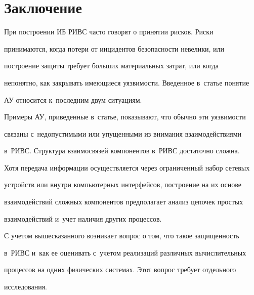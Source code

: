 \vspace*{-4pt}


  


\section{Заключение}





  При построении ИБ РИВС часто говорят о принятии рисков. Риски 


принимаются, когда потери от инцидентов безопасности невелики, или 


построение защиты требует больших материальных затрат, или когда 


непонятно, как закрывать имеющиеся уязвимости. Введенное в~статье понятие 


АУ относится к~последним двум ситуациям. 


  


  Примеры АУ, приведенные в~статье, показывают, что обычно эти уязвимости 


связаны с~недопустимыми или упущенными из внимания взаимодействиями 


в~РИВС. Структура взаимосвязей компонентов в~РИВС достаточно сложна. 


Хотя передача информации осуществляется через ограниченный набор сетевых 


устройств или внутри компьютерных интерфейсов, построение на их основе 


взаимодействий сложных компонентов предполагает анализ цепочек простых 


взаимодействий и~учет наличия других процессов. 


  


  С учетом вышесказанного возникает вопрос о том, что такое защищенность 


в~РИВС и~как ее оценивать с~учетом реализаций различных вычислительных 


процессов на одних физических системах. Этот вопрос требует отдельного 


исследования.





\vspace*{-4pt}


  


